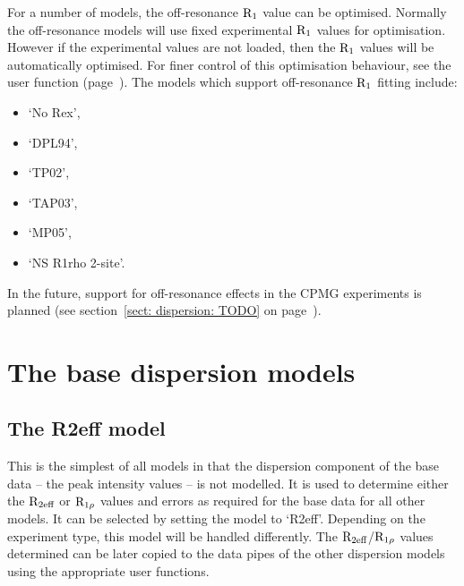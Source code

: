 For a number of models, the off-resonance $\mathrm{R}_1$ value can be optimised.
Normally the off-resonance models will use fixed experimental $\mathrm{R}_1$ values for optimisation.
However if the experimental values are not loaded, then the $\mathrm{R}_1$ values will be automatically optimised.
For finer control of this optimisation behaviour, see the  user function (page~\pageref{uf: relax_disp.r1_fit}).
The models which support off-resonance $\mathrm{R}_1$ fitting include:
\begin{itemize}
    \item `No Rex',
    \item `DPL94',
    \item `TP02',
    \item `TAP03',
    \item `MP05',
    \item `NS R1rho 2-site'.
\end{itemize}

In the future, support for off-resonance effects in the CPMG experiments is planned (see section~\ref{sect: dispersion: TODO} on page~\pageref{sect: dispersion: TODO}).






\section{The base dispersion models}
\label{sect: dispersion: base models}



\subsection{The R2eff model}
\label{sect: dispersion: R2eff model}

This is the simplest of all models in that the dispersion component of the base data -- the peak intensity values -- is not modelled.
It is used to determine either the $\mathrm{R}_{\textrm{2eff}}$ or $\mathrm{R}_{1\rho}$ values and errors as required for the base data for all other models.
It can be selected by setting the model to `R2eff'.
Depending on the experiment type, this model will be handled differently.
The $\mathrm{R}_{\textrm{2eff}}$/$\mathrm{R}_{1\rho}$ values determined can be later copied to the data pipes of the other dispersion models using the appropriate user functions.


